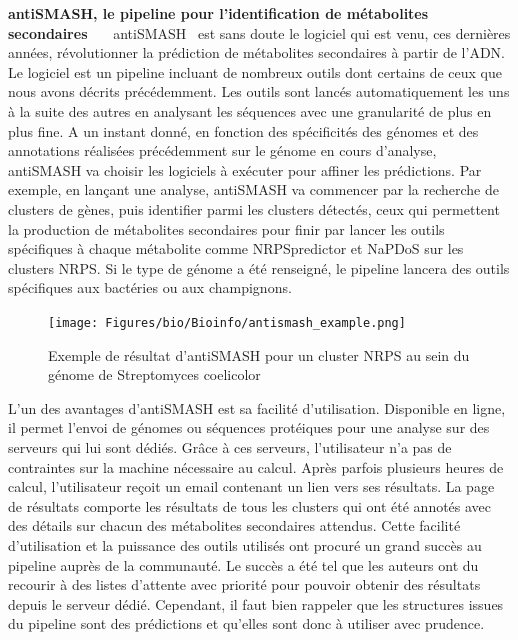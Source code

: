 \label{antismash}
\textbf{antiSMASH, le pipeline pour l'identification de métabolites secondaires}~~~
antiSMASH~\cite{weber_antismash_2015,medema_antismash:_2011} est sans doute le logiciel qui est venu, ces dernières années, révolutionner la prédiction de métabolites secondaires à partir de l'ADN.
Le logiciel est un pipeline incluant de nombreux outils dont certains de ceux que nous avons décrits précédemment.
Les outils sont lancés automatiquement les uns à la suite des autres en analysant les séquences avec une granularité de plus en plus fine.
A un instant donné, en fonction des spécificités des génomes et des annotations réalisées précédemment sur le génome en cours d'analyse, antiSMASH va choisir les logiciels à exécuter pour affiner les prédictions.
Par exemple, en lançant une analyse, antiSMASH va commencer par la recherche de clusters de gènes, puis identifier parmi les clusters détectés, ceux qui permettent la production de métabolites secondaires pour finir par lancer les outils spécifiques à chaque métabolite comme NRPSpredictor et NaPDoS sur les clusters NRPS.
Si le type de génome a été renseigné, le pipeline lancera des outils spécifiques aux bactéries ou aux champignons.

\begin{figure}
  \begin{center}
    \texttt{[image: Figures/bio/Bioinfo/antismash\_example.png]}
    \caption{\label{antismash_result}Exemple de résultat d'antiSMASH pour un cluster NRPS au sein du génome de Streptomyces coelicolor}
  \end{center}
\end{figure}

L'un des avantages d'antiSMASH est sa facilité d'utilisation.
Disponible en ligne, il permet l'envoi de génomes ou séquences protéiques pour une analyse sur des serveurs qui lui sont dédiés.
Grâce à ces serveurs, l'utilisateur n'a pas de contraintes sur la machine nécessaire au calcul.
Après parfois plusieurs heures de calcul, l'utilisateur reçoit un email contenant un lien vers ses résultats.
La page de résultats comporte les résultats de tous les clusters qui ont été annotés avec des détails sur chacun des métabolites secondaires attendus.
Cette facilité d'utilisation et la puissance des outils utilisés ont procuré un grand succès au pipeline auprès de la communauté.
Le succès a été tel que les auteurs ont du recourir à des listes d'attente avec priorité pour pouvoir obtenir des résultats depuis le serveur dédié.
Cependant, il faut bien rappeler que les structures issues du pipeline sont des prédictions et qu'elles sont donc à utiliser avec prudence.




